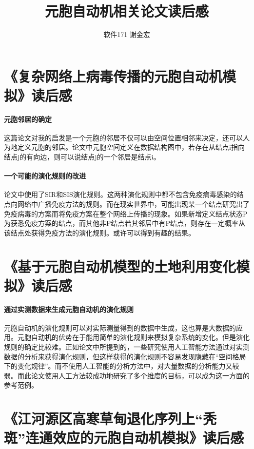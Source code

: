 \documentclass[UTF8]{ctexart}
\title{元胞自动机相关论文读后感}
\author{软件171 谢金宏}
\begin{document}
\maketitle

\section{《复杂网络上病毒传播的元胞自动机模拟》读后感}

\paragraph{元胞邻居的确定} 这篇论文对我的启发是一个元胞的邻居不仅可以由空间位置相邻来决定，还可以人为地定义元胞的邻居。论文中元胞空间定义在数据结构图中，若存在从结点i指向结点j的有向边，则可以说结点j的一个邻居是结点i。

\paragraph{一个可能的演化规则的改进} 论文中使用了SIR和SIS演化规则。这两种演化规则中都不包含免疫病毒感染的结点向网络中广播免疫方法的规则。而在现实世界中，可能出现某一个结点研究出了免疫病毒的方案而将免疫方案在整个网络上传播的现象。如果新增定义结点状态P为获悉免疫方案的结点，而其他非P结点若其邻居中有P结点，则存在一定概率从该结点处获得免疫方法的演化规则。或许可以得到有趣的结果。

\section{《基于元胞自动机模型的土地利用变化模拟》读后感}

\paragraph{通过实测数据来生成元胞自动机的演化规则} 元胞自动机的演化规则可以对实际测量得到的数据中生成，这也算是大数据的应用。元胞自动机的优势在于能用简单的演化规则来模拟复杂系统的变化。但是演化规则的确定比较难。正如论文中所提到的，一些研究使用人工智能方法通过对实测数据的分析来获得演化规则，但这样获得的演化规则不容易发现隐藏在“空间格局下的变化规律”。而不使用人工智能的分析方法中，对大量数据的分析能力又较弱。而此论文使用人工方法较成功地研究了多个维度的目标，可以成为这一方面的参考范例。

\section{《江河源区高寒草甸退化序列上“秃斑”连通效应的元胞自动机模拟》读后感}
\end{document}
